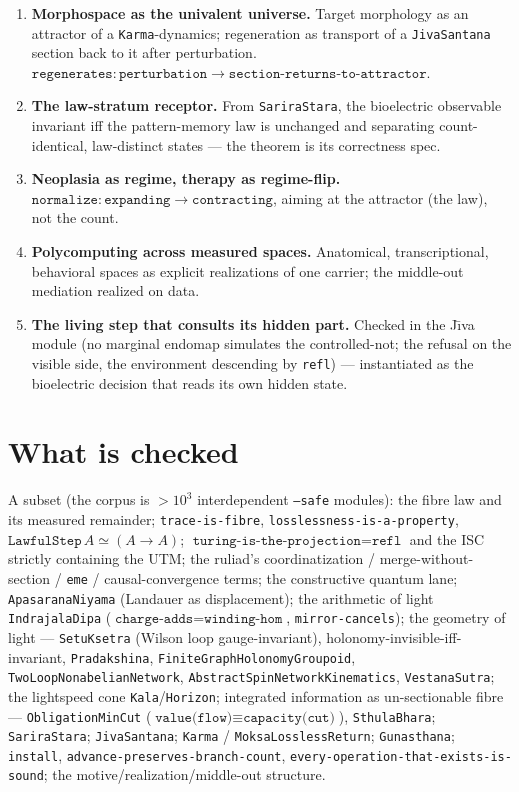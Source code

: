 \documentclass[11pt]{article}
\newcommand{\tm}[1]{\texttt{#1}}
\begin{document}
\begin{enumerate}
  \item \textbf{Morphospace as the univalent universe.} Target morphology as an
  attractor of a \tm{Karma}-dynamics; regeneration as transport of a
  \tm{JivaSantana} section back to it after perturbation.
  $\tm{regenerates} : \tm{perturbation} \to \tm{section-returns-to-attractor}$.
  \item \textbf{The law-stratum receptor.} From \tm{SariraStara}, the bioelectric
  observable invariant iff the pattern-memory law is unchanged and separating
  count-identical, law-distinct states --- the theorem is its correctness spec.
  \item \textbf{Neoplasia as regime, therapy as regime-flip.}
  $\tm{normalize} : \tm{expanding} \to \tm{contracting}$, aiming at the attractor
  (the law), not the count.
  \item \textbf{Polycomputing across measured spaces.} Anatomical,
  transcriptional, behavioral spaces as explicit realizations of one carrier; the
  middle-out mediation realized on data.
  \item \textbf{The living step that consults its hidden part.} Checked in the
  J\={\i}va module (no marginal endomap simulates the controlled-not; the refusal
  on the visible side, the environment descending by \tm{refl}) --- instantiated
  as the bioelectric decision that reads its own hidden state.
\end{enumerate}

\section{What is checked}

A subset (the corpus is $>10^3$ interdependent \tm{--safe} modules): the fibre
law and its measured remainder; \tm{trace-is-fibre},
\tm{losslessness-is-a-property}, $\tm{LawfulStep}\,A \simeq (A \to A)$;
$\tm{turing-is-the-projection} = \tm{refl}$ and the ISC strictly containing the
UTM; the ruliad's coordinatization / merge-without-section / \tm{eme} /
causal-convergence terms; the constructive quantum lane; \tm{ApasaranaNiyama}
(Landauer as displacement); the arithmetic of light \tm{IndrajalaDipa}
($\tm{charge-adds} = \tm{winding-hom}$, \tm{mirror-cancels}); the geometry of
light --- \tm{SetuKsetra} (Wilson loop gauge-invariant),
holonomy-invisible-iff-invariant, \tm{Pradakshina},
\tm{FiniteGraphHolonomyGroupoid}, \tm{TwoLoopNonabelianNetwork},
\tm{AbstractSpinNetworkKinematics}, \tm{VestanaSutra}; the lightspeed cone
\tm{Kala}/\tm{Horizon}; integrated information as un-sectionable fibre ---
\tm{ObligationMinCut} ($\tm{value(flow)} \equiv \tm{capacity(cut)}$),
\tm{SthulaBhara}; \tm{SariraStara}; \tm{JivaSantana}; \tm{Karma} /
\tm{MoksaLosslessReturn}; \tm{Gunasthana}; \tm{install},
\tm{advance-preserves-branch-count}, \tm{every-operation-that-exists-is-sound};
the motive/realization/middle-out structure.
\end{document}
